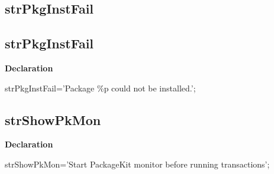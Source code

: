 \documentclass{report}
\newif\ifpdf
\begin{document}
\subsection*{\large{\textbf{strPkgInstFail}}\normalsize\hspace{1ex}\hrulefill}
\else
\subsection*{strPkgInstFail}
\fi
\label{trstrings-strPkgInstFail}
\begin{list}{}{
\setlength{\itemindent}{0cm}
\setlength{\listparindent}{0cm}
\setlength{\leftmargin}{\evensidemargin}
\addtolength{\leftmargin}{\tmplength}
\settowidth{\labelsep}{X}
\addtolength{\leftmargin}{\labelsep}
\setlength{\labelwidth}{\tmplength}
}
\item[\textbf{Declaration}\hfill]
\ifpdf
\begin{flushleft}
\fi
\begin{ttfamily}
strPkgInstFail='Package {\%}p could not be installed.';\end{ttfamily}

\ifpdf
\end{flushleft}
\fi

\end{list}
\ifpdf
\subsection*{\large{\textbf{strShowPkMon}}\normalsize\hspace{1ex}\hrulefill}
\else
\subsection*{strShowPkMon}
\fi
\label{trstrings-strShowPkMon}
\begin{list}{}{
\setlength{\itemindent}{0cm}
\setlength{\listparindent}{0cm}
\setlength{\leftmargin}{\evensidemargin}
\addtolength{\leftmargin}{\tmplength}
\settowidth{\labelsep}{X}
\addtolength{\leftmargin}{\labelsep}
\setlength{\labelwidth}{\tmplength}
}
\item[\textbf{Declaration}\hfill]
\ifpdf
\begin{flushleft}
\fi
\begin{ttfamily}
strShowPkMon='Start PackageKit monitor before running transactions';\end{ttfamily}

\ifpdf
\end{flushleft}
\fi

\end{list}
\ifpdf
\end{document}

